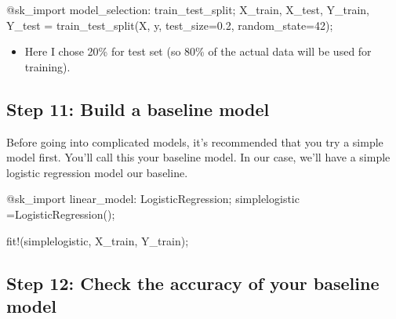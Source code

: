\documentclass[
  letterpaper,
]{book}
\newenvironment{Shaded}{\begin{snugshade}}{\end{snugshade}}
\newcommand{\FloatTok}[1]{\textcolor[rgb]{0.68,0.00,0.00}{#1}}
\newcommand{\FunctionTok}[1]{\textcolor[rgb]{0.28,0.35,0.67}{#1}}
\newcommand{\NormalTok}[1]{\textcolor[rgb]{0.00,0.23,0.31}{#1}}
\newcommand{\OperatorTok}[1]{\textcolor[rgb]{0.37,0.37,0.37}{#1}}
\newcommand{\PreprocessorTok}[1]{\textcolor[rgb]{0.68,0.00,0.00}{#1}}
\providecommand{\tightlist}{%
  \setlength{\itemsep}{0pt}\setlength{\parskip}{0pt}}\usepackage{longtable,booktabs,array}
\begin{document}
\begin{Shaded}
\begin{Highlighting}[]
\PreprocessorTok{@sk\_import}\NormalTok{ model\_selection}\OperatorTok{:}\NormalTok{ train\_test\_split;}
\NormalTok{X\_train, X\_test, Y\_train, Y\_test }\OperatorTok{=} 
    \FunctionTok{train\_test\_split}\NormalTok{(X, y, test\_size}\OperatorTok{=}\FloatTok{0.2}\NormalTok{, }
\NormalTok{        random\_state}\OperatorTok{=}\FloatTok{42}\NormalTok{);}
\end{Highlighting}
\end{Shaded}

\begin{itemize}
\tightlist
\item
  Here I chose 20\% for test set (so 80\% of the actual data will be
  used for training).
\end{itemize}

\hypertarget{step-11-build-a-baseline-model}{%
\subsection*{Step 11: Build a baseline
model}\label{step-11-build-a-baseline-model}}

Before going into complicated models, it's recommended that you try a
simple model first. You'll call this your baseline model. In our case,
we'll have a simple logistic regression model our baseline.

\begin{Shaded}
\begin{Highlighting}[]
\PreprocessorTok{@sk\_import}\NormalTok{ linear\_model}\OperatorTok{:}\NormalTok{ LogisticRegression;}
\NormalTok{simplelogistic }\OperatorTok{=}\FunctionTok{LogisticRegression}\NormalTok{();}

\FunctionTok{fit!}\NormalTok{(simplelogistic, X\_train, Y\_train);}
\end{Highlighting}
\end{Shaded}

\hypertarget{step-12-check-the-accuracy-of-your-baseline-model}{%
\subsection*{Step 12: Check the accuracy of your baseline
model}\label{step-12-check-the-accuracy-of-your-baseline-model}}
\end{document}
